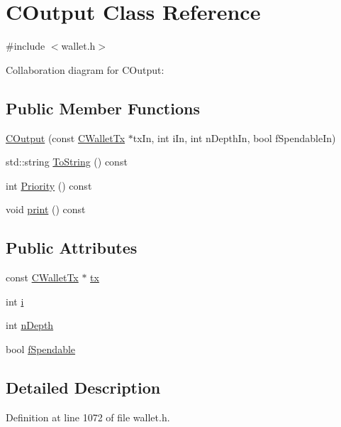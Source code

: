 \hypertarget{class_c_output}{}\section{C\+Output Class Reference}
\label{class_c_output}


{\ttfamily \#include $<$wallet.\+h$>$}



Collaboration diagram for C\+Output\+:
\subsection*{Public Member Functions}
\begin{DoxyCompactItemize}
\item 
\hyperlink{class_c_output_aeabdb54cd3dbac8e985cae6aa976c575}{C\+Output} (const \hyperlink{class_c_wallet_tx}{C\+Wallet\+Tx} $\ast$tx\+In, int i\+In, int n\+Depth\+In, bool f\+Spendable\+In)
\item 
std\+::string \hyperlink{class_c_output_a30a78d31f6667803c613efdef28cbe52}{To\+String} () const 
\item 
int \hyperlink{class_c_output_a7b967787d636440d6b67930a436d5c8f}{Priority} () const 
\item 
void \hyperlink{class_c_output_af9f37df9eace0c8a58b8029a2c59366f}{print} () const 
\end{DoxyCompactItemize}
\subsection*{Public Attributes}
\begin{DoxyCompactItemize}
\item 
const \hyperlink{class_c_wallet_tx}{C\+Wallet\+Tx} $\ast$ \hyperlink{class_c_output_ad5c15e7a2dc48258127b8fd5db421ad5}{tx}
\item 
int \hyperlink{class_c_output_ae1b3534a41afb09bb04a499017f2821e}{i}
\item 
int \hyperlink{class_c_output_a2eb24fc73c35fcc551b736d68bd1c64a}{n\+Depth}
\item 
bool \hyperlink{class_c_output_ab8fa647313fbc2cda12f8b064031dd11}{f\+Spendable}
\end{DoxyCompactItemize}


\subsection{Detailed Description}


Definition at line 1072 of file wallet.\+h.



